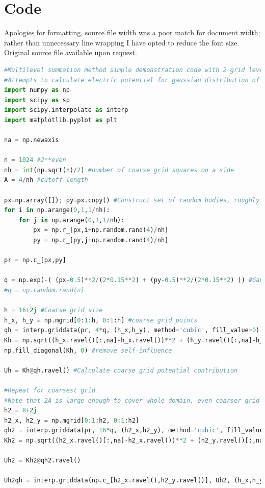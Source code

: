 \documentclass[review]{siamart}
\begin{document}
\section{Code}
\newline
Apologies for formatting, source file width was a poor match for document width; rather than unnecessary line wrapping I have opted to reduce the font size. Original source file available upon request. 
\begin{lstlisting}[language=Python,basicstyle=\tiny]
#Multilevel summation method simple demonstration code with 2 grid level hierarchy
#Attempts to calculate electric potential for gaussian distribution of charges
import numpy as np
import scipy as sp
import scipy.interpolate as interp
import matplotlib.pyplot as plt

na = np.newaxis

n = 1024 #2**even
nh = int(np.sqrt(n)/2) #number of coarse grid squares on a side
A = 4/nh #cutoff length

px=np.array([]); py=px.copy() #Construct set of random bodies, roughly evenly
for i in np.arange(0,1,1/nh):
    for j in np.arange(0,1,1/nh):
        px = np.r_[px,i+np.random.rand(4)/nh]
        py = np.r_[py,j+np.random.rand(4)/nh]

pr = np.c_[px,py]

q = np.exp(-( (px-0.5)**2/(2*0.15**2) + (py-0.5)**2/(2*0.15**2) )) #Gaussian strength
#q = np.random.rand(n)

h = 16+2j #Coarse grid size
h_x, h_y = np.mgrid[0:1:h, 0:1:h] #coarse grid points
qh = interp.griddata(pr, 4*q, (h_x,h_y), method='cubic', fill_value=0) #interpolated coarse grid charges
Kh = np.sqrt((h_x.ravel()[:,na]-h_x.ravel())**2 + (h_y.ravel()[:,na]-h_y.ravel())**2) #interpolated coarse kernel values
np.fill_diagonal(Kh, 0) #remove self-influence

Uh = Kh@qh.ravel() #Calculate coarse grid potential contribution

#Repeat for coarsest grid
#Note that 2A is large enough to cover whole domain, even coarser grid would be a waste
h2 = 8+2j
h2_x, h2_y = np.mgrid[0:1:h2, 0:1:h2]
qh2 = interp.griddata(pr, 16*q, (h2_x,h2_y), method='cubic', fill_value=0)
Kh2 = np.sqrt((h2_x.ravel()[:,na]-h2_x.ravel())**2 + (h2_y.ravel()[:,na]-h2_y.ravel())**2)

Uh2 = Kh2@qh2.ravel()

Uh2qh = interp.griddata(np.c_[h2_x.ravel(),h2_y.ravel()], Uh2, (h_x,h_y), method='cubic', fill_value=0) #Coarsest grid onto coarse grid


\end{lstlisting}
\end{document}
